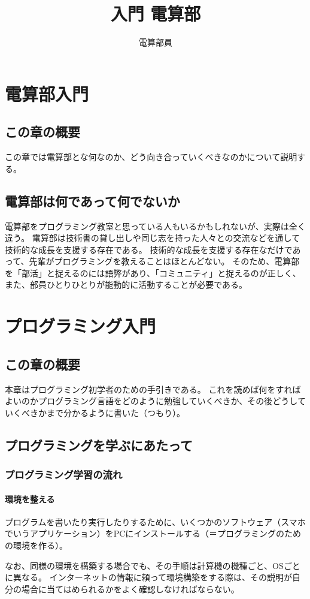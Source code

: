 \documentclass[lualatex,ja=standard,12pt,a4j]{bxjsbook}
\title{入門 電算部}
\author{電算部員}
\begin{document}
	\tableofcontents
	\chapter{電算部入門}
		\section{この章の概要}
			この章では電算部とな何なのか、どう向き合っていくべきなのかについて説明する。
		\section{電算部は何であって何でないか}
			電算部をプログラミング教室と思っている人もいるかもしれないが、実際は全く違う。
			電算部は技術書の貸し出しや同じ志を持った人々との交流などを通して技術的な成長を支援する存在である。
			技術的な成長を支援する存在なだけであって、先輩がプログラミングを教えることはほとんどない。
			そのため、電算部を「部活」と捉えるのには語弊があり、「コミュニティ」と捉えるのが正しく、
			また、部員ひとりひとりが能動的に活動することが必要である。
	\chapter{プログラミング入門}
		\section{この章の概要}
                本章はプログラミング初学者のための手引きである。
                これを読めば何をすればよいのかプログラミング言語をどのように勉強していくべきか、その後どうしていくべきかまで分かるように書いた（つもり）。
		\section{プログラミングを学ぶにあたって}
			\subsection{プログラミング学習の流れ}
			\subsubsection{環境を整える}
				プログラムを書いたり実行したりするために、いくつかのソフトウェア（スマホでいうアプリケーション）をPCにインストールする（＝プログラミングのための環境を作る）。
                
				なお、同様の環境を構築する場合でも、その手順は計算機の機種ごと、OSごとに異なる。
                インターネットの情報に頼って環境構築をする際は、その説明が自分の場合に当てはめられるかをよく確認しなければならない。
				
\end{document}
